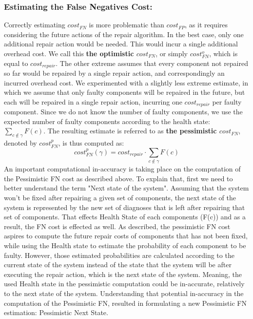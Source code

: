 \documentclass[review]{elsarticle}
\begin{document}
\subsubsection{Estimating the False Negatives Cost:}
Correctly estimating $cost_{FN}$ is more problematic than $cost_{FP}$, as it requires considering the future actions of the repair algorithm.
In the best case, only one additional repair action would be needed. This would incur a single additional overhead cost. We call this {\bf the optimistic $cost_{FN}$}, or simply $cost_{FN}^o$, which is equal to $cost_{repair}$.
The other extreme assumes that every component not repaired so far would be repaired by a single repair action, and correspondingly an incurred overhead cost. We experimented with a slightly less extreme estimate, in which we assume that only faulty components will be repaired in the future, but each will be repaired in a single repair action, incurring one $cost_{repair}$ per faulty component.
Since we do not know the number of faulty components, we use the expected number of faulty components according to the health state: $\sum_{c\notin \gamma} F(c)$. The resulting estimate is referred to as {\bf the pessimistic $cost_{FN}$}, denoted by $cost_{FN}^p$, is thus computed as:
\[ cost_{FN}^p(\gamma)=cost_{repair}\cdot \sum_{c\notin \gamma} F(c)\]
An important computational in-accuracy is taking place on the computation of the Pessimistic FN cost as described above. To explain that, first we need to better understand the term "Next state of the system". Assuming that the system won't be fixed after repairing a given set of components, the next state of the system is represented by the new set of diagnoses that is left after repairing that set of components. That effects Health State of each components (F(c)) and as a result, the FN cost is effected as well. As described, the pessimistic FN cost aspires to compute the future repair costs of components that has not been fixed, while using the Health state to estimate the probability of each component to be faulty. However, those estimated probabilities are calculated according to the current state of the system instead of the state that the system will be after executing the repair action, which is the next state of the system. Meaning, the used Health state in the pessimistic computation could be in-accurate, relatively to the next state of the system.
Understanding that potential in-accuracy in the computation of the Pessimistic FN, resulted in formulating a new Pessimistic FN estimation: Pessimistic Next State.
\end{document}
